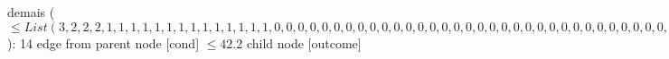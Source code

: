 {{{{{%
demais ($\leq List(3, 2, 2, 2, 1, 1, 1, 1, 1, 1, 1, 1, 1, 1, 1, 1, 1, 1, 0, 0, 0, 0, 0, 0, 0, 0, 0, 0, 0, 0, 0, 0, 0, 0, 0, 0, 0, 0, 0, 0, 0, 0, 0, 0, 0, 0, 0, 0, 0, 0, 0, 0, 0, 0, 0, 0, 0, 0, 0, 0, 0, 0, 0, 0, 0, 0, 0, 0, 0, 0, 0, 0, 0, 0, 0)$): 14} edge from parent node [cond] {$\leq42.2$}}
child {node [outcome] {
}}}}}
